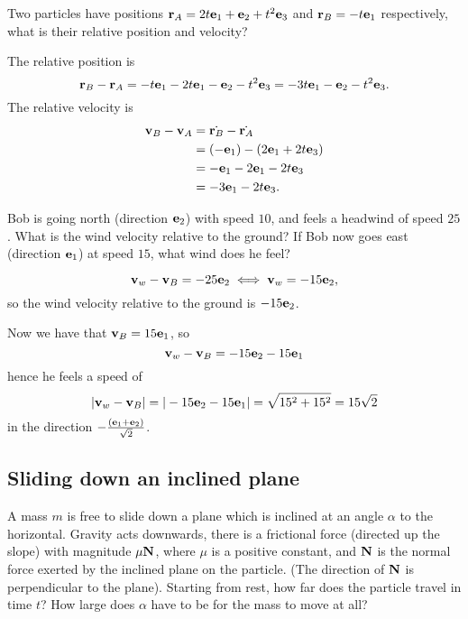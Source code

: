 \documentclass[10pt, a4paper]{article}
\begin{document}
\begin{example}
    Two particles have positions $\mathbf{r}_A = 2t\mathbf{e}_1 + \mathbf{e}_2 + t ^ 2\mathbf{e}_3$ and $\mathbf{r}_B = -t\mathbf{e}_1$ respectively,
    what is their relative position and velocity?
    
    \begin{solution}
        The relative position is
        \[
        \mathbf{r}_B - \mathbf{r}_A = -t\mathbf{e}_1 - 2t\mathbf{e}_1 - \mathbf{e}_2 - t ^ 2\mathbf{e}_3 = -3t\mathbf{e}_1 - \mathbf{e}_2 - t ^ 2\mathbf{e}_3.
        \]
        The relative velocity is
        \begin{align*}
            \mathbf{v}_B - \mathbf{v}_A &= \dot{\mathbf{r}_B} - \dot{\mathbf{r}_A} \\
            &= (-\mathbf{e}_1) - (2\mathbf{e}_1 + 2t\mathbf{e}_3) \\
            &= -\mathbf{e}_1 - 2\mathbf{e}_1 - 2t\mathbf{e}_3 \\
            &= -3\mathbf{e}_1 - 2t\mathbf{e}_3.
        \end{align*}
    \end{solution}
\end{example}

\begin{example}
    Bob is going north
    (direction $\mathbf{e}_2$)
    with speed $10$,
    and feels a headwind of speed $25$.
    What is the wind velocity relative to the ground?
    If Bob now goes east
    (direction $\mathbf{e}_1$)
    at speed $15$,
    what wind does he feel?

    \begin{solution}
        \[
        \mathbf{v}_w - \mathbf{v}_B = -25\mathbf{e}_2 \iff \mathbf{v}_w = -15\mathbf{e}_2,
        \]
        so the wind velocity relative to the ground is $-15\mathbf{e}_2$.

        Now we have that $\mathbf{v}_B = 15\mathbf{e}_1$,
        so
        \[
        \mathbf{v}_w - \mathbf{v}_B = -15\mathbf{e}_2 - 15\mathbf{e}_1
        \]
        hence he feels a speed of
        \[
        |\mathbf{v}_w - \mathbf{v}_B| = |-15\mathbf{e}_2 - 15\mathbf{e}_1| = \sqrt{15 ^ 2 + 15 ^ 2} = 15\sqrt{2}
        \]
        in the direction $-\frac{(\mathbf{e}_1 + \mathbf{e}_2)}{\sqrt{2}}$.
    \end{solution}
\end{example}

\subsection{Sliding down an inclined plane}
A mass $m$ is free to slide down a plane which is inclined at an angle $\alpha$ to the horizontal.
Gravity acts downwards,
there is a frictional force
(directed up the slope)
with magnitude $\mu \mathbf{N}$,
where $\mu$ is a positive constant,
and $\mathbf{N}$ is the normal force exerted by the inclined plane on the particle.
(The direction of $\mathbf{N}$ is perpendicular to the plane).
Starting from rest,
how far does the particle travel in time $t$?
How large does $\alpha$ have to be for the mass to move at all?
\end{document}
